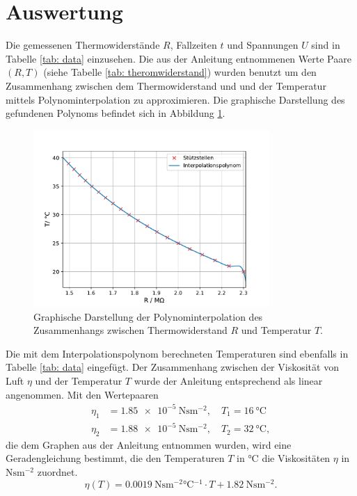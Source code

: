 \section{Auswertung}
Die gemessenen Thermowiderstände $R$, Fallzeiten $t$ und Spannungen $U$ sind in Tabelle \ref{tab: data} einzusehen.
Die aus der Anleitung entnommenen Werte Paare $(R, T)$ (siehe Tabelle \ref{tab: theromwiderstand}) wurden benutzt um den Zusammenhang
zwischen dem Thermowiderstand und und der Temperatur mittels Polynominterpolation zu approximieren. Die graphische
Darstellung des gefundenen Polynoms befindet sich in Abbildung \ref{fig: poly}.

\begin{figure}[H]
  \centering
  \includegraphics[width = 0.8\textwidth]{../Messdaten/temperature_fit.pdf}
  \caption{Graphische Darstellung der Polynominterpolation des Zusammenhangs zwischen Thermowiderstand $R$ und Temperatur $T$.}
  \label{fig: poly}
\end{figure}
 Die mit dem Interpolationspolynom berechneten
Temperaturen sind ebenfalls in Tabelle \ref{tab: data} eingefügt. Der Zusammenhang zwischen der Viskosität von Luft $\eta$ und
der Temperatur $T$ wurde der Anleitung \cite{anleitung503} entsprechend als linear angenommen. Mit den Wertepaaren
\begin{align}
  \eta_1 &= \SI{1.85e-5}{\newton\second\meter^{-2}}, \quad T_1 = \SI{16}{\celsius} \\
  \eta_2 &= \SI{1.88e-5}{\newton\second\meter^{-2}}, \quad T_2 = \SI{32}{\celsius},
\end{align}
die dem Graphen aus der Anleitung entnommen wurden, wird eine Geradengleichung bestimmt, die den Temperaturen
$T$ in $\si{\celsius}$ die Viskositäten $\eta$ in $\si{\newton\second\meter^{-2}}$ zuordnet.
\begin{equation}
  \eta(T) = \SI{0.0019}{\newton\second\meter^{-2} \celsius^{-1} } \cdot  T  + \SI{1.82}{\newton\second\meter^{-2}}.
\end{equation}
